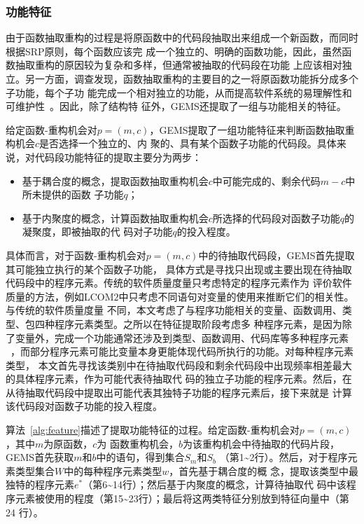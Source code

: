 \subsubsection{功能特征}

由于函数抽取重构的过程是将原函数中的代码段抽取出来组成一个新函数，而同时根据SRP原则，每个函数应该完
成一个独立的、明确的函数功能，因此，虽然函数抽取重构的原因较为复杂和多样，但通常被抽取的代码段在功能
上应该相对独立。另一方面，调查发现，函数抽取重构的主要目的之一将原函数功能拆分成多个子功能，每个子功
能完成一个相对独立的功能，从而提高软件系统的易理解性和可维护性~\cite{silva2016we}。因此，除了结构特
征外，GEMS还提取了一组与功能相关的特征。

给定函数-重构机会对$p=(m,c)$，GEMS提取了一组功能特征来判断函数抽取重构机会$c$是否选择一个独立的、内
聚的、具有某个函数子功能的代码段。具体来说，对代码段功能特征的提取主要分为两步：
\begin{itemize}
  \item 基于耦合度的概念，提取函数抽取重构机会$c$中可能完成的、剩余代码$m-c$中所未提供的函数
  子功能$q$；
  \item 基于内聚度的概念，计算函数抽取重构机会$c$所选择的代码段对函数子功能$q$的凝聚度，即被抽取的代
  码对子功能$q$的投入程度。
\end{itemize}

具体而言，对于函数-重构机会对$p=(m,c)$中的待抽取代码段，GEMS首先提取其可能独立执行的某个函数子功能，
具体方式是寻找只出现或主要出现在待抽取代码段中的程序元素。传统的软件质量度量只考虑特定的程序元素作为
评价软件质量的方法，例如LCOM$2$中只考虑不同语句对变量的使用来推断它们的相关性。与传统的软件质量度量
不同，本文考虑了与程序功能相关的变量、函数调用、类型、包四种程序元素类型。之所以在特征提取阶段考虑多
种程序元素，是因为除了变量外，完成一个功能通常还涉及到类型、函数调用、代码库等多种程序元素
~\cite{martin2003agile}，而部分程序元素可能比变量本身更能体现代码所执行的功能。对每种程序元素类型，
本文首先寻找该类别中在待抽取代码段和剩余代码段中出现频率相差最大的具体程序元素，作为可能代表待抽取代
码的独立子功能的程序元素。然后，在从待抽取代码段中提取出可能代表其独特子功能的程序元素后，接下来就是
计算该代码段对函数子功能的投入程度。

算法~\ref{alg:feature}描述了提取功能特征的过程。给定函数-重构机会对$p=(m,c)$，其中$m$为原函数，$c$为
函数重构机会，$b$为该重构机会中待抽取的代码片段，GEMS首先获取$m$和$b$中的语句，得到集合$S_m$和$S_b$
（第1\textasciitilde2行）。然后，对于程序元素类型集合$W$中的每种程序元素类型$w$，首先基于耦合度的概
念，提取该类型中最独特的程序元素$e^*$（第6\textasciitilde14行）；然后基于内聚度的概念，计算待抽取代
码中该程序元素被使用的程度（第15\textasciitilde23行）；最后将这两类特征分别放到特征向量中（第24
行）。

